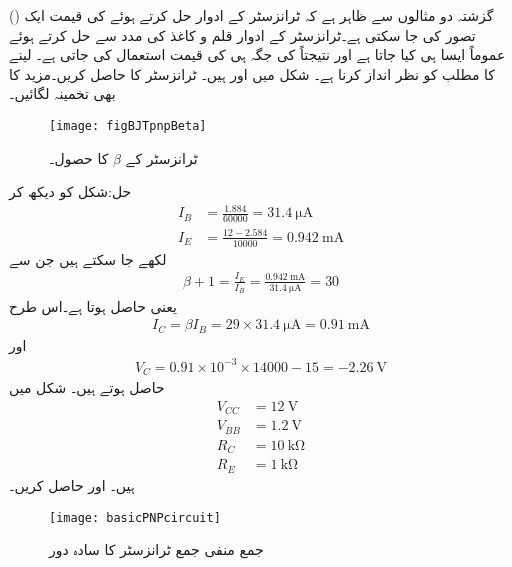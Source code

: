 گزشتہ دو مثالوں سے ظاہر ہے کہ ٹرانزسٹر کے ادوار حل کرتے ہوئے  کی قیمت ایک () تصور کی جا سکتی ہے۔ٹرانزسٹر کے ادوار قلم و کاغذ کی مدد سے حل کرتے ہوئے عموماً ایسا ہی کیا جاتا ہے اور نتیجتاً  کی جگہ  ہی کی قیمت استعمال کی جاتی ہے۔ لینے کا مطلب  کو نظر انداز کرنا ہے۔
شکل  میں  اور  ہیں۔ ٹرانزسٹر کا  حاصل کریں۔مزید  کا بھی تخمینہ لگائیں۔
\begin{figure}
\centering
\texttt{[image: figBJTpnpBeta]}
\caption{ٹرانزسٹر کے $\beta$ کا حصول۔}
\label{شکل_ٹرانزسٹر_بیٹا_حصول}
\end{figure}
%

حل:شکل کو دیکھ کر
\begin{align*}
I_B&=\frac{1.884}{60000}=\SI{31.4}{\micro \ampere}\\
I_E&=\frac{12-2.584}{10000}=\SI{0.942}{\milli \ampere}
\end{align*}
لکھے جا سکتے ہیں جن سے
\begin{align*}
\beta+1=\frac{I_E}{I_B}=\frac{\SI{0.942}{\milli \ampere}}{\SI{31.4}{\micro \ampere}}=30
\end{align*}
یعنی  حاصل ہوتا ہے۔اس طرح
\begin{align*}
I_C=\beta I_B=29 \times \SI{31.4}{\micro \ampere}=\SI{0.91}{\milli \ampere}
\end{align*}
اور
\begin{align*}
V_C=0.91 \times 10^{-3} \times 14000-15=\SI{-2.26}{\volt}
\end{align*}
حاصل ہوتے ہیں۔
شکل  میں
\begin{align*}
V_{CC}&=\SI{12}{\volt} \\
V_{BB}&=\SI{1.2}{\volt} \\
R_C& = \SI{10}{\kilo \ohm}\\
R_E&=\SI{1}{\kilo \ohm}
\end{align*}
ہیں۔ اور  حاصل کریں۔
\begin{figure}
\centering
\texttt{[image: basicPNPcircuit]}
\caption{جمع منفی جمع ٹرانزسٹر کا سادہ دور}
\label{شکل_ٹرانزسٹر__جمع_منفی_جمع_سادہ_دور}
\end{figure}

